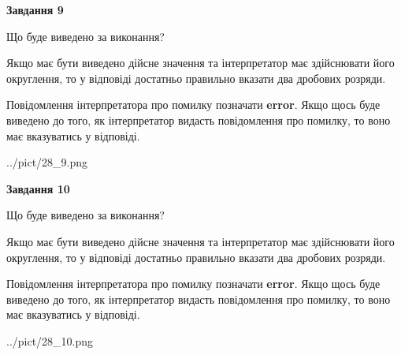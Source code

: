 \documentclass[12pt, ukrainian]{article}
\begin{document}
{\begin {Large}
{\begin {center}\textbf{Завдання 9}\end {center}}\par
Що буде виведено за виконання? \par

Якщо має бути виведено дійсне значення та інтерпретатор має здійснювати його округлення, 
то у відповіді достатньо правильно вказати два дробових розряди.

Повідомлення інтерпретатора про помилку позначати \textbf{error}.
Якщо щось буде виведено до того, як інтерпретатор видасть повідомлення про помилку, 
то воно має вказуватись у відповіді. \par

\begin{center}
	{../pict/28_9.png}
\end{center}
\newpage

{\begin {center}\textbf{Завдання 10}\end {center}}\par
Що буде виведено за виконання? \par

Якщо має бути виведено дійсне значення та інтерпретатор має здійснювати його округлення, 
то у відповіді достатньо правильно вказати два дробових розряди.

Повідомлення інтерпретатора про помилку позначати \textbf{error}.
Якщо щось буде виведено до того, як інтерпретатор видасть повідомлення про помилку, 
то воно має вказуватись у відповіді. \par

\begin{center}
	{../pict/28_10.png}
\end{center}
\newpage

\end {Large}}
\end{document}
